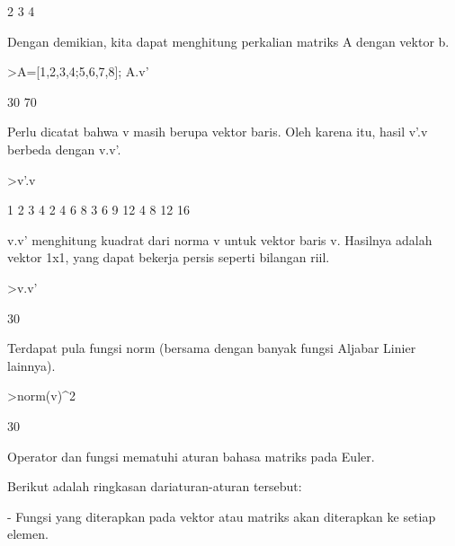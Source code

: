 \documentclass{article}
\newenvironment{eulernotebook}{\par}{\par}
\newenvironment{eulercomment}{\par\medskip}{\par\medskip}
\begin{document}
\begin{eulernotebook}
\begin{eulercomment}
\begin{eulercomment}
\begin{eulercomment}
\begin{eulercomment}
\begin{eulercomment}
\begin{eulercomment}
\begin{euleroutput}
              2 
              3 
              4 
\end{euleroutput}
\begin{eulercomment}
Dengan demikian, kita dapat menghitung perkalian matriks A dengan
vektor b.
\end{eulercomment}
\begin{eulerprompt}
>A=[1,2,3,4;5,6,7,8]; A.v'
\end{eulerprompt}
\begin{euleroutput}
             30 
             70 
\end{euleroutput}
\begin{eulercomment}
Perlu dicatat bahwa v masih berupa vektor baris. Oleh karena itu,
hasil v'.v berbeda dengan v.v'.
\end{eulercomment}
\begin{eulerprompt}
>v'.v
\end{eulerprompt}
\begin{euleroutput}
              1             2             3             4 
              2             4             6             8 
              3             6             9            12 
              4             8            12            16 
\end{euleroutput}
\begin{eulercomment}
v.v' menghitung kuadrat dari norma v untuk vektor baris v. Hasilnya
adalah vektor 1x1, yang dapat bekerja persis seperti bilangan riil.
\end{eulercomment}
\begin{eulerprompt}
>v.v'
\end{eulerprompt}
\begin{euleroutput}
  30
\end{euleroutput}
\begin{eulercomment}
Terdapat pula fungsi norm (bersama dengan banyak fungsi Aljabar Linier
lainnya).
\end{eulercomment}
\begin{eulerprompt}
>norm(v)^2
\end{eulerprompt}
\begin{euleroutput}
  30
\end{euleroutput}
\begin{eulercomment}
Operator dan fungsi mematuhi aturan bahasa matriks pada Euler.

Berikut adalah ringkasan dariaturan-aturan tersebut:

- Fungsi yang diterapkan pada vektor atau matriks akan diterapkan ke
setiap elemen.


\end{eulercomment}
\end{eulercomment}
\end{eulercomment}
\end{eulercomment}
\end{eulercomment}
\end{eulercomment}
\end{eulercomment}
\end{eulernotebook}
\end{document}
